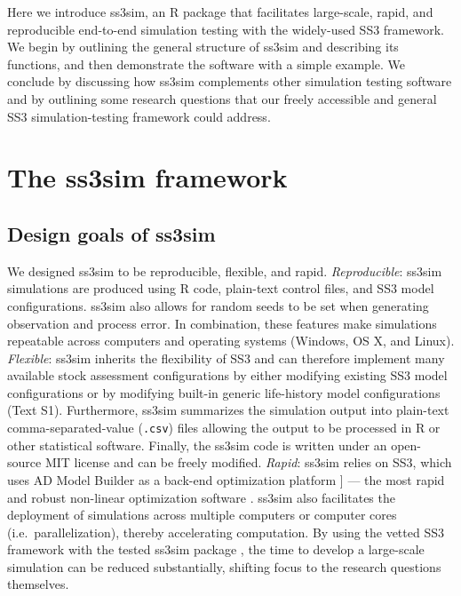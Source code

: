 \documentclass[10pt]{article}
\begin{document}
Here we introduce ss3sim, an R package that facilitates large-scale, rapid, and reproducible end-to-end simulation testing with the widely-used SS3 framework. We begin by outlining the general structure of ss3sim and describing its functions, and then demonstrate the software with a simple example. We conclude by discussing how ss3sim complements other simulation testing software and by outlining some research questions that our freely accessible and general SS3 simulation-testing framework could address.

\section*{The ss3sim framework}

\subsection*{Design goals of ss3sim}

We designed ss3sim to be reproducible, flexible, and rapid. \emph{Reproducible}: ss3sim simulations are produced using R code, plain-text control files, and SS3 model configurations. ss3sim also allows for random seeds to be set when generating observation and process error. In combination, these features make simulations repeatable across computers and operating systems (Windows, OS X, and Linux). \emph{Flexible}: ss3sim inherits the flexibility of SS3 and can therefore implement many available stock assessment configurations by either modifying existing SS3 model configurations or by modifying built-in generic life-history model configurations (Text S1). Furthermore, ss3sim summarizes the simulation output into plain-text comma-separated-value (\texttt{.csv}) files allowing the output to be processed in R or other statistical software. Finally, the ss3sim code is written under an open-source MIT license and can be freely modified. \emph{Rapid}: ss3sim relies on SS3, which uses AD Model Builder as a back-end optimization platform \cite{fournier2012}{]} --- the most rapid and robust non-linear optimization software \cite{bolker2013}. ss3sim also facilitates the deployment of simulations across multiple computers or computer cores (i.e.~parallelization), thereby accelerating computation. By using the vetted SS3 framework \cite{methot2013} with the tested ss3sim package \cite{johnson2013, ono2013}, the time to develop a large-scale simulation can be reduced substantially, shifting focus to the research questions themselves.
\end{document}
